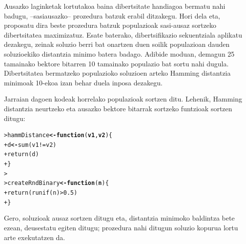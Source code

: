 \documentclass[eu]{ifirak}\usepackage[]{graphicx}\usepackage[]{color}
\makeatletter
\newcommand{\hlnum}[1]{\textcolor[rgb]{0.659,0.4,0.051}{#1}}%
\newcommand{\hlopt}[1]{\textcolor[rgb]{0,0,0}{#1}}%
\newcommand{\hlstd}[1]{\textcolor[rgb]{0,0,0}{#1}}%
\newcommand{\hlkwa}[1]{\textcolor[rgb]{0.133,0.224,0.659}{\textbf{#1}}}%
\newcommand{\hlkwb}[1]{\textcolor[rgb]{0.549,0.114,0.412}{\textbf{#1}}}%
\newcommand{\hlkwc}[1]{\textcolor[rgb]{0.659,0.573,0.133}{\textbf{#1}}}%
\newcommand{\hlkwd}[1]{\textcolor[rgb]{0.659,0.133,0.482}{#1}}%
\newenvironment{kframe}{%
 \def\at@end@of@kframe{}%
 \ifinner\ifhmode%
  \def\at@end@of@kframe{\end{minipage}}%
  \begin{minipage}{\columnwidth}%
 \fi\fi%
 \def\FrameCommand##1{\hskip\@totalleftmargin \hskip-\fboxsep
 \colorbox{shadecolor}{##1}\hskip-\fboxsep
     \hskip-\linewidth \hskip-\@totalleftmargin \hskip\columnwidth}%
 \MakeFramed {\advance\hsize-\width
   \@totalleftmargin\z@ \linewidth\hsize
   \@setminipage}}%
 {\par\unskip\endMakeFramed%
 \at@end@of@kframe}
\newenvironment{knitrout}{}{} %
\makeatother
\begin{document}
Ausazko laginketak lortutakoa baina dibertsitate handiagoa bermatu nahi badugu, --sasiausazko-- prozedura batzuk erabil ditzakegu. Hori dela eta, proposatu dira beste prozedura batzuk populazioak sasi-ausaz sortzeko dibertsitatea maximizatuz. Esate baterako, dibertsifikazio sekuentziala aplikatu dezakegu, zeinak soluzio berri bat onartzen duen soilik populazioan dauden soluzioekiko distantzia minimo batera badago. Adibide moduan, demagun 25 tamainako bektore bitarren 10 tamainako populazio bat sortu nahi dugula. Dibertsitatea bermatzeko populazioko soluzioen arteko Hamming distantzia minimoak 10-ekoa izan behar duela inposa dezakegu. 

Jarraian dagoen kodeak horrelako populazioak sortzen ditu. Lehenik, Hamming distantzia neurtzeko eta ausazko bektore bitarrak sortzeko funtzioak sortzen ditugu:

\begin{knitrout}
\color{fgcolor}\begin{kframe}
\begin{alltt}
\hlstd{> }\hlstd{hammDistance} \hlkwb{<-} \hlkwa{function} \hlstd{(}\hlkwc{v1}\hlstd{,} \hlkwc{v2}\hlstd{) \{}
\hlstd{+ }  \hlstd{d} \hlkwb{<-} \hlkwd{sum}\hlstd{(v1} \hlopt{!=} \hlstd{v2)}
\hlstd{+ }  \hlkwd{return}\hlstd{(d)}
\hlstd{+ }\hlstd{\}}
\hlstd{> }
\hlstd{> }\hlstd{createRndBinary} \hlkwb{<-} \hlkwa{function}\hlstd{(}\hlkwc{n}\hlstd{) \{}
\hlstd{+ }  \hlkwd{return} \hlstd{(}\hlkwd{runif}\hlstd{(n)} \hlopt{>} \hlnum{0.5}\hlstd{)}
\hlstd{+ }\hlstd{\}}
\end{alltt}
\end{kframe}
\end{knitrout}

 Gero, soluzioak ausaz sortzen ditugu eta, distantzia minimoko baldintza bete ezean, deusestatu egiten ditugu; prozedura nahi ditugun soluzio kopurua lortu arte exekutatzen da. 
\end{document}
